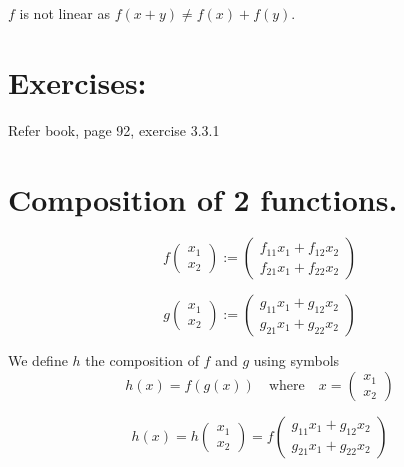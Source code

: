 $f$ is not linear as $f(x+y) \neq f(x) + f(y)$.

\section*{Exercises:}
Refer book, page 92, exercise 3.3.1

\section*{Composition of 2 functions.}
\[
f\begin{pmatrix}
x_1 \\
x_2
\end{pmatrix}
:=
\begin{pmatrix}
f_{11}x_1 + f_{12}x_2 \\
f_{21}x_1 + f_{22}x_2
\end{pmatrix}
\]

\[
g\begin{pmatrix}
x_1 \\
x_2
\end{pmatrix}
:=
\begin{pmatrix}
g_{11}x_1 + g_{12}x_2 \\
g_{21}x_1 + g_{22}x_2
\end{pmatrix}
\]

We define $h$ the composition of $f$ and $g$ using symbols
\[
h(x) = f(g(x)) \quad \text{where} \quad x = \begin{pmatrix}
x_1 \\
x_2
\end{pmatrix}
\]

\[
h(x) = h\begin{pmatrix}
x_1 \\
x_2
\end{pmatrix}
=
f\begin{pmatrix}
g_{11}x_1 + g_{12}x_2 \\
g_{21}x_1 + g_{22}x_2
\end{pmatrix}
\]

